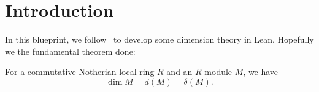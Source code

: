 \section{Introduction}

In this blueprint, we follow~\cite{MR1771925} to develop some dimension theory in Lean. Hopefully we the fundamental theorem done:
\begin{theorem}
  For a commutative Notherian local ring $R$ and an $R$-module $M$, we have
  \[
\dim M = d(M) = \delta(M).
  \]
\end{theorem}

